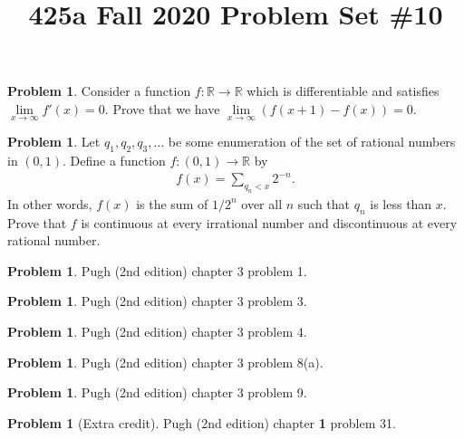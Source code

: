 \documentclass[11pt, reqno]{amsart}
\theoremstyle{definition}
\newtheorem{problem}[thm]{Problem}
\theoremstyle{remark}
\numberwithin{equation}{subsection}
\numberwithin{figure}{section}
\numberwithin{table}{section}
\newcommand{\R}{\mathbb{R}}
\begin{document}
\title{425a Fall 2020 Problem Set \#10} 



\maketitle



\begin{problem}
Consider a function $f: \R \rightarrow \R$ which is differentiable and satisfies $\lim\limits_{x \rightarrow \infty} f'(x) = 0$.
Prove that we have $\lim\limits_{x \rightarrow \infty}\left( f(x+1)-f(x)\right) = 0.$
\end{problem}

\begin{problem}
Let $q_1,q_2,q_3,\dots$ be some enumeration of the set of rational numbers in $(0,1)$.
Define a function $f: (0,1) \rightarrow \R$ by
\begin{align*}
f(x) = \sum_{q_n < x} 2^{-n}.
\end{align*}
In other words, $f(x)$ is the sum of $1/2^n$ over all $n$ such that $q_n$ is less than $x$.
Prove that $f$ is continuous at every irrational number and discontinuous at every rational number.

\end{problem}

\begin{problem}
Pugh (2nd edition) chapter 3 problem 1.
\end{problem}

\begin{problem}
Pugh (2nd edition) chapter 3 problem 3.
\end{problem}

\begin{problem}
Pugh (2nd edition) chapter 3 problem 4.
\end{problem}

\begin{problem}
Pugh (2nd edition) chapter 3 problem 8(a).
\end{problem}

\begin{problem}
Pugh (2nd edition) chapter 3 problem 9.
\end{problem}



\begin{problem}[Extra credit]
Pugh (2nd edition) chapter {\bf 1} problem 31.
\end{problem}
\end{document}
